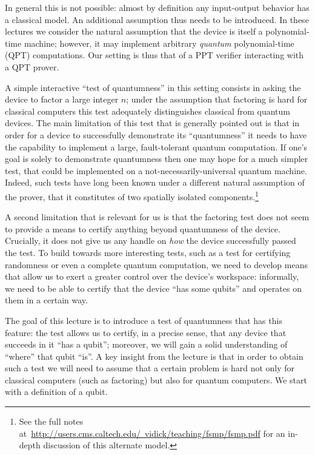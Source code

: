 In general this is not possible: almost by definition any input-output behavior has a classical model. An additional assumption thus needs to be introduced. In these lectures we consider the natural assumption that the device is itself a polynomial-time machine; however, it may implement arbitrary \emph{quantum} polynomial-time (QPT) computations. Our setting is thus that of a PPT verifier interacting with a QPT prover. 

A simple interactive ``test of quantumness'' in this setting consists in asking the device to factor a large integer $n$; under the assumption that factoring is hard for classical computers this test adequately distinguishes classical from quantum devices. 
The main limitation of this test that is generally pointed out is that in order for a device to successfully demonstrate its ``quantumness'' it needs to have the capability to implement a large, fault-tolerant quantum computation. If one's goal is solely to demonstrate quantumness then one may hope for a much simpler test, that could be implemented on a not-necessarily-universal quantum machine. Indeed, such tests have long been known under a different natural assumption of the prover, that it constitutes of two spatially isolated components.\footnote{See the full notes at~\href{http://users.cms.caltech.edu/\~{}vidick/teaching/fsmp/fsmp.pdf}{http://users.cms.caltech.edu/~vidick/teaching/fsmp/fsmp.pdf} for an in-depth discussion of this alternate model.} 

A second limitation that is relevant for us is that the factoring test does not seem to provide a means to certify anything beyond quantumness of the device. Crucially, it does not give us any handle on \emph{how} the device successfully passed the test. To build towards more interesting tests, such as a test for certifying randomness or even a complete quantum computation, we need to develop means that allow us to exert a greater control over the device's workspace: informally, we need to be able to certify that the device ``has some qubits'' and operates on them in a certain way. 

The goal of this lecture is to introduce a test of quantumness that has this feature: the test allows us to certify, in a precise sense, that any device that succeeds in it ``has a qubit''; moreover, we will gain a solid understanding of ``where'' that qubit ``is''. A key insight from the lecture is that in order to obtain such a  test we will need to assume that a certain problem is hard not only for classical computers (such as factoring) but also for quantum computers. We start with a definition of a qubit. 

